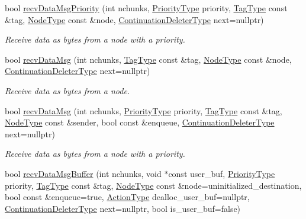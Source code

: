 \begin{DoxyCompactItemize}
bool \hyperlink{structvt_1_1messaging_1_1_active_messenger_afd1df9e2ef65cbce28b3785a17c96348}{recv\+Data\+Msg\+Priority} (int nchunks, \hyperlink{namespacevt_a86bff9f556eb761b27fc8600d006ac04}{Priority\+Type} priority, \hyperlink{namespacevt_a84ab281dae04a52a4b243d6bf62d0e52}{Tag\+Type} const \&tag, \hyperlink{namespacevt_a866da9d0efc19c0a1ce79e9e492f47e2}{Node\+Type} const \&node, \hyperlink{namespacevt_a6de3bd201e2a040be9362d9d24d1e446}{Continuation\+Deleter\+Type} next=nullptr)
\begin{DoxyCompactList}\small\item\em Receive data as bytes from a node with a priority. \end{DoxyCompactList}\item 
bool \hyperlink{structvt_1_1messaging_1_1_active_messenger_a9dc244ad2e4fbb24a7bb0b0cd2ef0b61}{recv\+Data\+Msg} (int nchunks, \hyperlink{namespacevt_a84ab281dae04a52a4b243d6bf62d0e52}{Tag\+Type} const \&tag, \hyperlink{namespacevt_a866da9d0efc19c0a1ce79e9e492f47e2}{Node\+Type} const \&node, \hyperlink{namespacevt_a6de3bd201e2a040be9362d9d24d1e446}{Continuation\+Deleter\+Type} next=nullptr)
\begin{DoxyCompactList}\small\item\em Receive data as bytes from a node. \end{DoxyCompactList}\item 
bool \hyperlink{structvt_1_1messaging_1_1_active_messenger_a3e804443f73230399bcda8f14f069128}{recv\+Data\+Msg} (int nchunks, \hyperlink{namespacevt_a86bff9f556eb761b27fc8600d006ac04}{Priority\+Type} priority, \hyperlink{namespacevt_a84ab281dae04a52a4b243d6bf62d0e52}{Tag\+Type} const \&tag, \hyperlink{namespacevt_a866da9d0efc19c0a1ce79e9e492f47e2}{Node\+Type} const \&sender, bool const \&enqueue, \hyperlink{namespacevt_a6de3bd201e2a040be9362d9d24d1e446}{Continuation\+Deleter\+Type} next=nullptr)
\begin{DoxyCompactList}\small\item\em Receive data as bytes from a node with a priority. \end{DoxyCompactList}\item 
bool \hyperlink{structvt_1_1messaging_1_1_active_messenger_addd48e0a672831571151e7b7f4324376}{recv\+Data\+Msg\+Buffer} (int nchunks, void $\ast$const user\+\_\+buf, \hyperlink{namespacevt_a86bff9f556eb761b27fc8600d006ac04}{Priority\+Type} priority, \hyperlink{namespacevt_a84ab281dae04a52a4b243d6bf62d0e52}{Tag\+Type} const \&tag, \hyperlink{namespacevt_a866da9d0efc19c0a1ce79e9e492f47e2}{Node\+Type} const \&node=uninitialized\+\_\+destination, bool const \&enqueue=true, \hyperlink{namespacevt_ae0a5a7b18cc99d7b732cb4d44f46b0f3}{Action\+Type} dealloc\+\_\+user\+\_\+buf=nullptr, \hyperlink{namespacevt_a6de3bd201e2a040be9362d9d24d1e446}{Continuation\+Deleter\+Type} next=nullptr, bool is\+\_\+user\+\_\+buf=false)

\end{DoxyCompactItemize}
